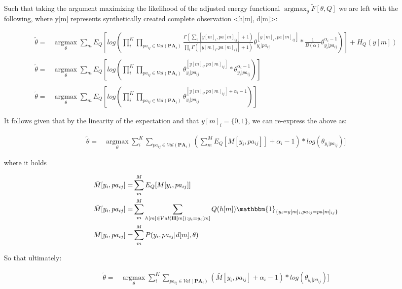 \documentclass[11pt]{article}
\begin{document}
\begin{article}
Such that taking the argument maximizing the likelihood of the
adjusted energy functional \(\operatorname*{argmax}_{\theta}
   \tilde{F}[\theta, Q]\) we are left with the following, where y[m]
represents synthetically created complete observation <h[m],
d[m]>:

\begin{align} \label{eq:first-order-condition}
\tilde{\theta} =& \operatorname*{argmax}_{\theta} \sum_m E_Q[log(\prod_i^K \prod_{pa_{ij} \in Val(\textbf{PA}_i)}
\frac{\Gamma(\sum_i [y[m]_i, pa[m]_{ij}] + 1)}{\prod_i \Gamma([y[m]_i,pa[m]_{ij}] + 1)} \theta_{y_i | pa_{ij}}^{[y[m]_i, pa[m]_{ij}]} * \frac{1}{B(\alpha)} \theta_{y_i | pa_{ij}}^{\alpha_i - 1})] + H_Q (y[m]) \\
\nonumber\\   
\tilde{\theta} =& \operatorname*{argmax}_{\theta} \sum_m E_Q[log(\prod_i^K \prod_{pa_{ij} \in Val(\textbf{PA}_i)} \theta_{y_i | pa_{ij}}^{[y[m]_i, pa[m]_{ij}]} * \theta_{y_i | pa_{ij}}^{\alpha_i - 1})]\\
\nonumber\\   
\tilde{\theta} =& \operatorname*{argmax}_{\theta} \sum_m E_Q[log(\prod_i^K \prod_{pa_{ij} \in Val(\textbf{PA}_i)} \theta_{y_i | pa_{ij}}^{[y[m]_i, pa[m]_{ij}] + \alpha_i - 1})] 
\end{align}

It follows given that by the linearity of the expectation and that
\(y[m]_i = \{0,1\}\), we can re-express the above as:

\begin{align} \label{eq:solution1}
\tilde{\theta} =& \operatorname*{argmax}_{\theta} \sum_i^K \sum_{pa_{ij} \in Val(\textbf{PA}_i)} (\sum_m^M E_Q[M[y_i, pa_{ij}]] + \alpha_i - 1) * log(\theta_{y_i | pa_{ij}})] 
\end{align}

where it holds

\begin{align} \label{eq:expected_sufficient}
\bar{M}[y_i, pa_{ij}]  =& \sum_m^M E_Q[M[y_i, pa_{ij}]]\\
\bar{M}[y_i, pa_{ij}]  =& \sum_m^M \sum_{h[m] \in Val(\textbf{H}[m]): y_i = y_i[m]} Q(h[m]) \mathbbm{1}_{\{y_i = y[m]_i, pa_{ij} = pa[m]_{ij}\}}\\
\bar{M}[y_i, pa_{ij}]  =& \sum_m^M P(y_i, pa_{ij} | d[m], \theta)
\end{align}

So that ultimately:

\begin{align} \label{eq:solution2}
\tilde{\theta} =& \operatorname*{argmax}_{\theta} \sum_i^K  \sum_{pa_{ij} \in Val(\textbf{PA}_i)} (\bar{M}[y_i, pa_{ij}] + \alpha_i - 1) * log(\theta_{y_i | pa_{ij}})] 
\end{align}


\end{article}
\end{document}
